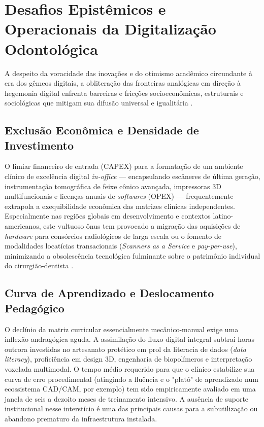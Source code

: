 \section{Desafios Epistêmicos e Operacionais da Digitalização Odontológica}
\label{sec:desafios}

A despeito da voracidade das inovações e do otimismo acadêmico circundante à era dos gêmeos digitais, a obliteração das fronteiras analógicas em direção à hegemonia digital enfrenta barreiras e fricções socioeconômicas, estruturais e sociológicas que mitigam sua difusão universal e igualitária \cite{li2025impacts}.

\subsection*{Exclusão Econômica e Densidade de Investimento}

O limiar financeiro de entrada (CAPEX) para a formatação de um ambiente clínico de excelência digital \textit{in-office} — encapsulando escâneres de última geração, instrumentação tomográfica de feixe cônico avançada, impressoras 3D multifuncionais e licenças anuais de \textit{softwares} (OPEX) — frequentemente extrapola a exequibilidade econômica das matrizes clínicas independentes. Especialmente nas regiões globais em desenvolvimento e contextos latino-americanos, este vultuoso ônus tem provocado a migração das aquisições de \textit{hardware} para consórcios radiológicos de larga escala ou o fomento de modalidades locatícias transacionais (\textit{Scanners as a Service} e \textit{pay-per-use}), minimizando a obsolescência tecnológica fulminante sobre o patrimônio individual do cirurgião-dentista \cite{cuadros2023access}.

\subsection*{Curva de Aprendizado e Deslocamento Pedagógico}

O declínio da matriz curricular essencialmente mecânico-manual exige uma inflexão andragógica aguda. A assimilação do fluxo digital integral subtrai horas outrora investidas no artesanato protético em prol da literacia de dados (\textit{data literacy}), proficiência em design 3D, engenharia de biopolímeros e interpretação voxelada multimodal. O tempo médio requerido para que o clínico estabilize sua curva de erro procedimental (atingindo a fluência e o "platô" de aprendizado num ecossistema CAD/CAM, por exemplo) tem sido empiricamente avaliado em uma janela de seis a dezoito meses de treinamento intensivo. A ausência de suporte institucional nesse interstício é uma das principais causas para a subutilização ou abandono prematuro da infraestrutura instalada.

